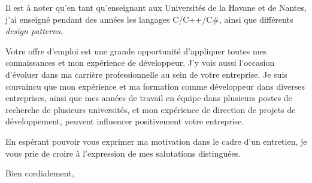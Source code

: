 \documentclass[11pt,a4paper]{letter} %
\newcommand{\resume}{Votre offre d'emploi est une grande opportunité d'appliquer toutes mes connaissances et mon expérience de développeur. J'y vois aussi l'occasion d'évoluer dans ma carrière professionnelle au sein de votre entreprise. Je suis convaincu que mon expérience et ma formation comme développeur dans diverses entreprises, ainsi que mes années de travail en équipe dans plusieurs postes de recherche de plusieurs universités, et mon expérience de direction de projets de développement, peuvent influencer positivement votre entreprise.}
\begin{document}
\begin{letter}
Il est à noter qu'en tant qu'enseignant aux Universités de la Havane et de Nantes, j'ai enseigné pendant des années les langages C/C++/C\#, ainsi 
que différents \textit{design patterns}.

\resume{} 


En espérant pouvoir vous exprimer ma motivation dans le cadre d'un entretien, je vous prie de croire %
à l'expression de mes salutations distinguées.

\closing{Bien cordialement,}


\end{letter}
\end{document}

